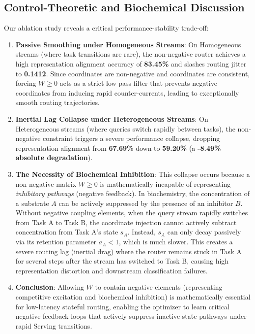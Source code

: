 \subsection{Control-Theoretic and Biochemical Discussion}
Our ablation study reveals a critical performance-stability trade-off:
\begin{enumerate}
    \item \textbf{Passive Smoothing under Homogeneous Streams}: On Homogeneous streams (where task transitions are rare), the non-negative router achieves a high representation alignment accuracy of \textbf{83.45\%} and slashes routing jitter to \textbf{0.1412}. Since coordinates are non-negative and coordinates are consistent, forcing $W \ge 0$ acts as a strict low-pass filter that prevents negative coordinates from inducing rapid counter-currents, leading to exceptionally smooth routing trajectories.
    \item \textbf{Inertial Lag Collapse under Heterogeneous Streams}: On Heterogeneous streams (where queries switch rapidly between tasks), the non-negative constraint triggers a severe performance collapse, dropping representation alignment from \textbf{67.69\%} down to \textbf{59.20\%} (a \textbf{-8.49\% absolute degradation}). 
    \item \textbf{The Necessity of Biochemical Inhibition}: This collapse occurs because a non-negative matrix $W \ge 0$ is mathematically incapable of representing \emph{inhibitory pathways} (negative feedback). In biochemistry, the concentration of a substrate $A$ can be actively suppressed by the presence of an inhibitor $B$. Without negative coupling elements, when the query stream rapidly switches from Task A to Task B, the coordinate injection cannot actively subtract concentration from Task A's state $s_A$. Instead, $s_A$ can only decay passively via its retention parameter $a_A < 1$, which is much slower. This creates a severe routing lag (inertial drag) where the router remains stuck in Task A for several steps after the stream has switched to Task B, causing high representation distortion and downstream classification failures.
    \item \textbf{Conclusion}: Allowing $W$ to contain negative elements (representing competitive excitation and biochemical inhibition) is mathematically essential for low-latency stateful routing, enabling the optimizer to learn critical negative feedback loops that actively suppress inactive state pathways under rapid Serving transitions.
\end{enumerate}
